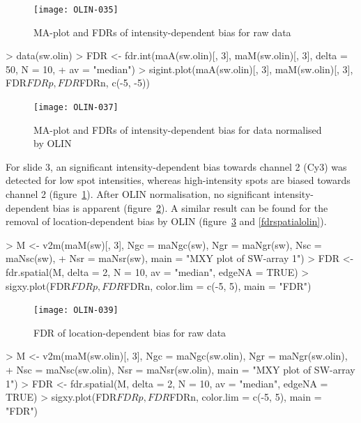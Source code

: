 \documentclass[a4paper,11pt]{article}
\begin{document}
\begin{figure}[t]
\centering
\texttt{[image: OLIN-035]}
\caption{MA-plot and FDRs of  intensity-dependent bias for raw data }
\label{fdrintraw}
\end{figure}



\begin{Schunk}
\begin{Sinput}
> data(sw.olin)
> FDR <- fdr.int(maA(sw.olin)[, 3], maM(sw.olin)[, 3], delta = 50, N = 10, 
+ av = "median")
> sigint.plot(maA(sw.olin)[, 3], maM(sw.olin)[, 3], FDR$FDRp, FDR$FDRn, c(-5, -5))
\end{Sinput}
\end{Schunk}



\begin{figure}
\centering
\texttt{[image: OLIN-037]}
\caption{MA-plot and FDRs of  intensity-dependent bias for data normalised by OLIN }
\label{fdrintolin}
\end{figure}

For slide 3, an significant intensity-dependent bias towards channel 2 (Cy3)
was detected for low spot intensities, whereas high-intensity spots are biased
towards channel 2 (figure~\ref{fdrintraw}). After OLIN normalisation, no significant intensity-dependent
bias is apparent (figure~\ref{fdrintolin}). A similar result can be found for the 
removal of location-dependent bias by OLIN (figure~\ref{fdrspatialraw} and \ref{fdrspatialolin}).


\begin{Schunk}
\begin{Sinput}
> M <- v2m(maM(sw)[, 3], Ngc = maNgc(sw), Ngr = maNgr(sw), Nsc = maNsc(sw),
+ Nsr = maNsr(sw), main = "MXY plot of SW-array 1")
> FDR <- fdr.spatial(M, delta = 2, N = 10, av = "median", edgeNA = TRUE)
> sigxy.plot(FDR$FDRp, FDR$FDRn, color.lim = c(-5, 5), main = "FDR")
\end{Sinput}
\end{Schunk}




\begin{figure}
\centering
\texttt{[image: OLIN-039]}
\caption{FDR of location-dependent bias for raw data }
\label{fdrspatialraw}
\end{figure}


\begin{Schunk}
\begin{Sinput}
> M <- v2m(maM(sw.olin)[, 3], Ngc = maNgc(sw.olin), Ngr = maNgr(sw.olin),
+  Nsc = maNsc(sw.olin),  Nsr = maNsr(sw.olin), main = "MXY plot of SW-array 1")
> FDR <- fdr.spatial(M, delta = 2, N = 10, av = "median", edgeNA = TRUE)
> sigxy.plot(FDR$FDRp, FDR$FDRn, color.lim = c(-5, 5), main = "FDR")
\end{Sinput}
\end{Schunk}
\end{document}
